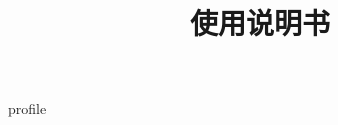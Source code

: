 \documentclass[CJK, hyperref, oneside]{z-book}
\title {\modtitle \\ 使用说明书}
\begin{document}
\date{}
\maketitle

\tableofcontents
{
    \let\clearpage\relax
    \listoftables
    \listoffigures
}
\clearpage

\def\DIRNAME{.}
{profile}


%    
\end{document}

